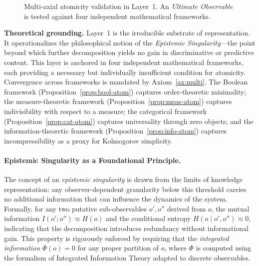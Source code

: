 \begin{figure}[htbp]
{
    }
    \caption{Multi-axial atomicity validation in Layer~1. An \textit{Ultimate Observable} is tested against four independent mathematical frameworks.}
    \label{fig:decomposition}
\end{figure}

\textbf{Theoretical grounding.} Layer~1 is the irreducible substrate of representation. It operationalizes the philosophical notion of the \textit{Epistemic Singularity}---the point beyond which further decomposition yields no gain in discriminative or predictive content. This layer is anchored in four independent mathematical frameworks, each providing a necessary but individually insufficient condition for atomicity. Convergence across frameworks is mandated by Axiom~\ref{ax:multi}. The Boolean framework (Proposition~\ref{prop:bool-atom}) captures order-theoretic minimality; the measure-theoretic framework (Proposition~\ref{prop:meas-atom}) captures indivisibility with respect to a measure; the categorical framework (Proposition~\ref{prop:cat-atom}) captures universality through zero objects; and the information-theoretic framework (Proposition~\ref{prop:info-atom}) captures incompressibility as a proxy for Kolmogorov simplicity.

\paragraph{Epistemic Singularity as a Foundational Principle.}
The concept of an \emph{epistemic singularity} is drawn from the limits of knowledge representation: any observer-dependent granularity below this threshold carries no additional information that can influence the dynamics of the system. Formally, for any two putative sub‑observables $o', o''$ derived from $o$, the mutual information $I(o'; o'') \approx H(o)$ and the conditional entropy $H(o \mid o', o'') \approx 0$, indicating that the decomposition introduces redundancy without informational gain. This property is rigorously enforced by requiring that the \emph{integrated information} $\Phi(o) = 0$ for any proper partition of $o$, where $\Phi$ is computed using the formalism of Integrated Information Theory adapted to discrete observables.

